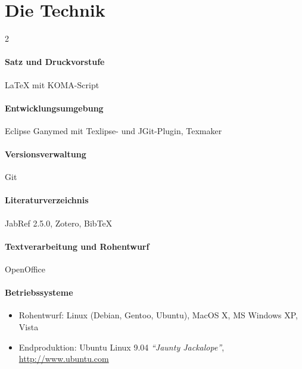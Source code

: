 \documentclass[ngerman,a4paper,fontsize=9pt,BCOR=1.5cm,headings=big,draft=no]{scrbook}
\begin{document}
\section*{Die Technik}

\begin{multicols}{2}
\paragraph{Satz und Druckvorstufe} \LaTeX{} mit {\sffamily KOMA-Script} 
\paragraph{Entwicklungsumgebung} Eclipse Ganymed mit Texlipse- und JGit-Plugin,
Texmaker
\paragraph{Versionsverwaltung} Git
\paragraph{Literaturverzeichnis} JabRef 2.5.0, Zotero,
BibTeX \paragraph{Textverarbeitung und Rohentwurf} OpenOffice 
\paragraph{Betriebssysteme} \par

 \begin{itemize}
  \item Rohentwurf: Linux (Debian, Gentoo, Ubuntu), MacOS X, MS Windows XP, Vista
  \item Endproduktion: Ubuntu Linux 9.04
  \textit{"`Jaunty Jackalope"'}, \url{http://www.ubuntu.com}
 \end{itemize}

\end{multicols}

\setcounter{tocdepth}{2}
\dominitoc
\tableofcontents
\end{document}
